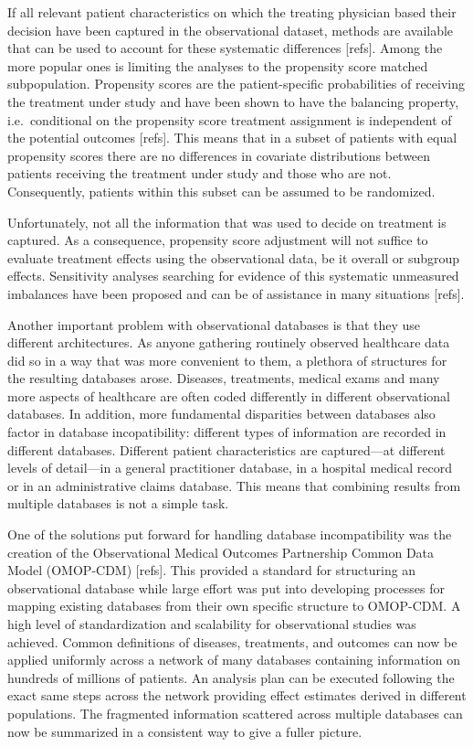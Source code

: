 \documentclass[
]{book}
\begin{document}
If all relevant patient characteristics on which the treating physician based
their decision have been captured in the observational dataset, methods are
available that can be used to account for these systematic differences
{[}refs{]}. Among the more popular ones is limiting the analyses to the propensity
score matched subpopulation. Propensity scores are the patient-specific
probabilities of receiving the treatment under study and have been shown to have
the balancing property, i.e.~conditional on the propensity score treatment
assignment is independent of the potential outcomes {[}refs{]}. This means that in a
subset of patients with equal propensity scores there are no differences in
covariate distributions between patients receiving the treatment under study and
those who are not. Consequently, patients within this subset can be assumed to
be randomized.

Unfortunately, not all the information that was used to decide on treatment is
captured. As a consequence, propensity score adjustment will not suffice to
evaluate treatment effects using the observational data, be it overall or
subgroup effects. Sensitivity analyses searching for evidence of this systematic
unmeasured imbalances have been proposed and can be of assistance in many
situations {[}refs{]}.

Another important problem with observational databases is that they use
different architectures. As anyone gathering routinely observed healthcare data
did so in a way that was more convenient to them, a plethora of structures for
the resulting databases arose. Diseases, treatments, medical exams and many more
aspects of healthcare are often coded differently in different observational
databases. In addition, more fundamental disparities between databases also
factor in database incopatibility: different types of information are recorded
in different databases. Different patient characteristics are captured---at
different levels of detail---in a general practitioner database, in a hospital
medical record or in an administrative claims database. This means that
combining results from multiple databases is not a simple task.

One of the solutions put forward for handling database incompatibility was the
creation of the Observational Medical Outcomes Partnership Common Data Model
(OMOP-CDM) {[}refs{]}. This provided a standard for structuring an observational
database while large effort was put into developing processes for mapping
existing databases from their own specific structure to OMOP-CDM. A high level of
standardization and scalability for observational studies was achieved. Common
definitions of diseases, treatments, and outcomes can now be applied uniformly
across a network of many databases containing information on hundreds of
millions of patients. An analysis plan can be executed following the exact same
steps across the network providing effect estimates derived in different
populations. The fragmented information scattered across multiple databases can
now be summarized in a consistent way to give a fuller picture.
\end{document}

